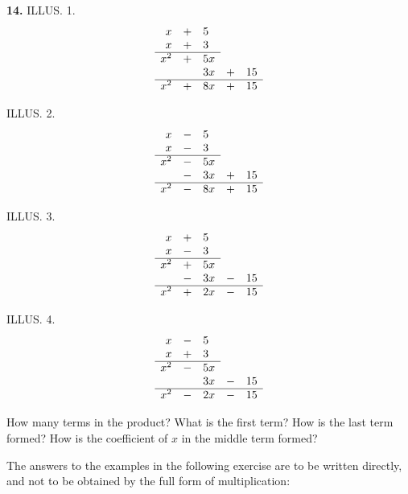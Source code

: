 \documentclass{book}
\begin{document}
\textbf{14.} ILLUS. 1.
\settowidth{\arraycolsep}{$\mskip0.5\thickmuskip$}
\[
\begin{array}{rclll}
x &+& 5 &&\\
x &+& 3 &&\\
\multispan{3}\hrulefill &&\\
x^2 &+& 5x &&\\
&& 3x &+& 15 \\
\multispan{5}\hrulefill \\
x^2 &+& 8x &+& 15 \\
\end{array}
\]

ILLUS. 2.
\[
\begin{array}{rclll}
x &-& 5 &&\\
x &-& 3 &&\\
\multispan{3}\hrulefill &&\\
x^2 &-& 5x &&\\
&-& 3x &+& 15 \\
\multispan{5}\hrulefill \\
x^2 &-& 8x &+& 15 \\
\end{array}
\]

ILLUS. 3.
\[
\begin{array}{rclll}
x &+& 5 &&\\
x &-& 3 &&\\
\multispan{3}\hrulefill &&\\
x^2 &+& 5x &&\\
&-& 3x &-& 15 \\
\multispan{5}\hrulefill \\
x^2 &+& 2x &-& 15 \\
\end{array}
\]

ILLUS. 4.
\[
\begin{array}{rclll}
x &-& 5 &&\\
x &+& 3 &&\\
\multispan{3}\hrulefill &&\\
x^2 &-& 5x &&\\
&& 3x &-& 15 \\
\multispan{5}\hrulefill \\
x^2 &-& 2x &-& 15 \\
\end{array}
\]

How many terms in the product? What is the first
term? How is the last term formed? How is the
coefficient of $x$ in the middle term formed?

The answers to the examples in the following exercise
are to be written directly, and not to be obtained by the
full form of multiplication:
\end{document}
